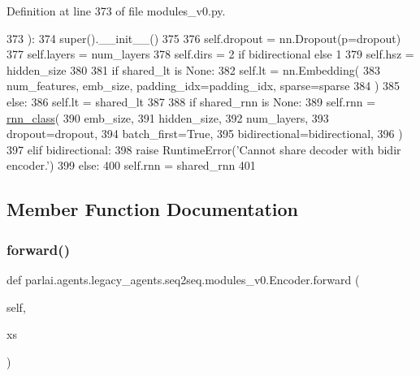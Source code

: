 Definition at line 373 of file modules\+\_\+v0.\+py.


\begin{DoxyCode}
373     ):
374         super().\_\_init\_\_()
375 
376         self.dropout = nn.Dropout(p=dropout)
377         self.layers = num\_layers
378         self.dirs = 2 \textcolor{keywordflow}{if} bidirectional \textcolor{keywordflow}{else} 1
379         self.hsz = hidden\_size
380 
381         \textcolor{keywordflow}{if} shared\_lt \textcolor{keywordflow}{is} \textcolor{keywordtype}{None}:
382             self.lt = nn.Embedding(
383                 num\_features, emb\_size, padding\_idx=padding\_idx, sparse=sparse
384             )
385         \textcolor{keywordflow}{else}:
386             self.lt = shared\_lt
387 
388         \textcolor{keywordflow}{if} shared\_rnn \textcolor{keywordflow}{is} \textcolor{keywordtype}{None}:
389             self.rnn = \hyperlink{namespaceseq2seq_1_1train_a46177da1cc74c4a2874e4a527d857f75}{rnn\_class}(
390                 emb\_size,
391                 hidden\_size,
392                 num\_layers,
393                 dropout=dropout,
394                 batch\_first=\textcolor{keyword}{True},
395                 bidirectional=bidirectional,
396             )
397         \textcolor{keywordflow}{elif} bidirectional:
398             \textcolor{keywordflow}{raise} RuntimeError(\textcolor{stringliteral}{'Cannot share decoder with bidir encoder.'})
399         \textcolor{keywordflow}{else}:
400             self.rnn = shared\_rnn
401 
\end{DoxyCode}


\subsection{Member Function Documentation}
\mbox{\label{classparlai_1_1agents_1_1legacy__agents_1_1seq2seq_1_1modules__v0_1_1Encoder_a53c7f1b88916692c14fa744077b3bd77}} 
\subsubsection{\texorpdfstring{forward()}{forward()}}
{\footnotesize\ttfamily def parlai.\+agents.\+legacy\+\_\+agents.\+seq2seq.\+modules\+\_\+v0.\+Encoder.\+forward (\begin{DoxyParamCaption}\item[{}]{self,  }\item[{}]{xs }\end{DoxyParamCaption})}



